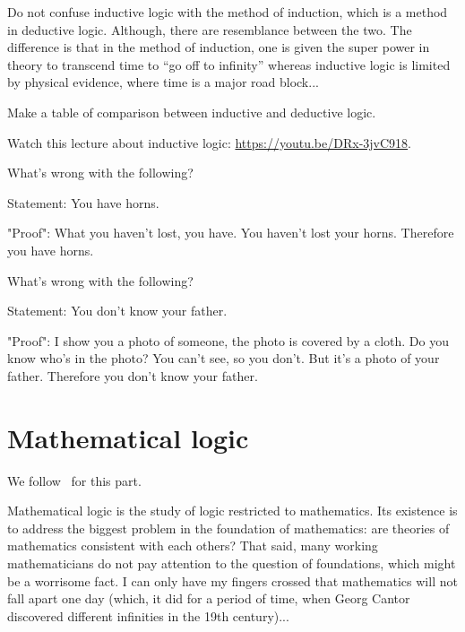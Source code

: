 \begin{warning}
   Do not confuse inductive logic with the method of induction, which is a method
   in deductive logic.
   Although, there are resemblance between the two. The difference is that in the method
   of induction,
   one is given the super power in theory to transcend time to ``go off to infinity''
   whereas inductive logic is limited by physical evidence, where 
   time is a major road block...
\end{warning}

\begin{exercise}
    Make a table of comparison between inductive and deductive logic.
\end{exercise}

Watch this lecture about inductive logic: \url{https://youtu.be/DRx-3jvC918}.

\begin{exercise}
   What's wrong with the following?
    
   Statement: You have horns.
   
    "Proof": What you haven't lost, you have. You haven't lost your horns. Therefore you have horns. 
\end{exercise}

\begin{exercise}
   What's wrong with the following?
    
   Statement: You don't know your father.

    "Proof": I show you a photo of someone, the photo is covered by a cloth. Do you know who's in the photo? You can't see, so you don't. But it's a photo of your father. Therefore you don't know your father.
\end{exercise}

\section{Mathematical logic}
We follow~\cite{Newstead} for this part.

Mathematical logic is the study of logic restricted to mathematics. 
Its existence is to address the biggest problem in the foundation of mathematics: 
are theories of mathematics consistent with each others?
That said, many working mathematicians do not pay attention to the question of foundations, which might be a worrisome fact.
I can only have my fingers crossed that mathematics will not fall apart one day 
(which, it did for a period of time, when Georg Cantor discovered different infinities in the 19th century)...

